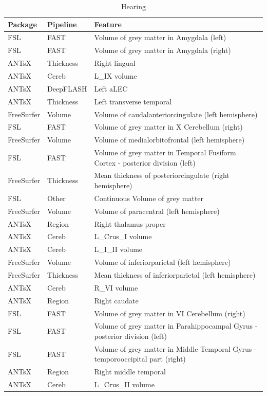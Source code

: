 \documentclass[
  10pt,
]{article}
\begin{document}
\begin{table}

\caption{\label{tab:compare-predictions}Hearing}
\centering
\begin{tabular}[t]{lll}
\toprule
Package & Pipeline & Feature\\
\midrule
FSL & FAST & Volume of grey matter in Amygdala (left)\\
FSL & FAST & Volume of grey matter in Amygdala (right)\\
ANTsX & Thickness & Right lingual\\
ANTsX & Cereb & L\_IX volume\\
ANTsX & DeepFLASH & Left aLEC\\
\addlinespace
ANTsX & Thickness & Left transverse temporal\\
FreeSurfer & Volume & Volume of caudalanteriorcingulate (left hemisphere)\\
FSL & FAST & Volume of grey matter in X Cerebellum (right)\\
FreeSurfer & Volume & Volume of medialorbitofrontal (left hemisphere)\\
FSL & FAST & Volume of grey matter in Temporal Fusiform Cortex - posterior division (left)\\
\addlinespace
FreeSurfer & Thickness & Mean thickness of posteriorcingulate (right hemisphere)\\
FSL & Other & Continuous    Volume of grey matter\\
FreeSurfer & Volume & Volume of paracentral (left hemisphere)\\
ANTsX & Region & Right thalamus proper\\
ANTsX & Cereb & L\_Crus\_I volume\\
\addlinespace
ANTsX & Cereb & L\_I\_II volume\\
FreeSurfer & Volume & Volume of inferiorparietal (left hemisphere)\\
FreeSurfer & Thickness & Mean thickness of inferiorparietal (left hemisphere)\\
ANTsX & Cereb & R\_VI volume\\
ANTsX & Region & Right caudate\\
\addlinespace
FSL & FAST & Volume of grey matter in VI Cerebellum (right)\\
FSL & FAST & Volume of grey matter in Parahippocampal Gyrus - posterior division (left)\\
FSL & FAST & Volume of grey matter in Middle Temporal Gyrus - temporooccipital part (right)\\
ANTsX & Region & Right middle temporal\\
ANTsX & Cereb & L\_Crus\_II volume\\
\bottomrule
\end{tabular}
\end{table}
\end{document}
